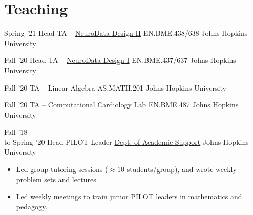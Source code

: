 \section{Teaching}

\cventry
{Spring '21}
{Head TA -- \href{http://neurodatadesign.io}{NeuroData Design II}}
{EN.BME.438/638}
{Johns Hopkins University}
{}
{}

\cventry
{Fall '20}
{Head TA -- \href{http://neurodatadesign.io}{NeuroData Design I}}
{EN.BME.437/637}
{Johns Hopkins University}
{}
{}

\cventry
{Fall '20}
{TA -- Linear Algebra}
{AS.MATH.201}
{Johns Hopkins University}
{}
{}

\cventry
{Fall '20}
{TA -- Computational Cardiology Lab}
{EN.BME.487}
{Johns Hopkins University}
{}
{}

\cventry
{Fall '18 \\to Spring '20}
{Head PILOT Leader}
{\href{https://academicsupport.jhu.edu/pilot/}{Dept. of Academic Support}}
{Johns Hopkins University}
{}
{
\begin{itemize}
    \item Led group tutoring sessions ($\approx 10$ students/group), and wrote weekly problem sets and lectures.
    \item Led weekly meetings to train junior PILOT leaders in mathematics and pedagogy.
\end{itemize}
}